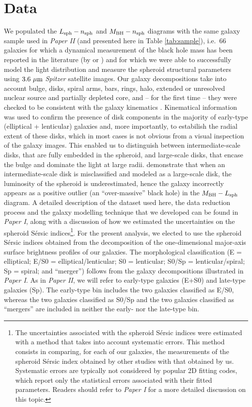 \documentclass[preprint2]{emulateapj}
\begin{document}
\section{Data}
We populated the $L_{\rm sph} - n_{\rm sph}$ and $M_{\rm BH} - n_{\rm sph}$ diagrams 
with the same galaxy sample used in \emph{Paper II} (and presented here in Table \ref{tab:sample}), 
i.e.~66 galaxies for which a dynamical measurement of the black hole mass has been reported in the literature 
(by \citealt{grahamscott2013} or \citealt{rusli2013}) 
and for which we were able to successfully model the light distribution and measure the spheroid structural parameters 
using $3.6\rm~\mu m$ \emph{Spitzer} satellite images. 
Our galaxy decompositions take into account bulge, disks, spiral arms, bars, rings, halo, 
extended or unresolved nuclear source and partially depleted core, 
and -- for the first time -- they were checked to be consistent with the galaxy kinematics 
\citep{atlas3dIII,scott2014,arnold2014}. 
Kinematical information was used to confirm the presence of disk components 
in the majority of early-type (elliptical + lenticular) galaxies and, more importantly,  
to estabilish the radial extent of these disks, 
which in most cases is not obvious from a visual inspection of the galaxy images. 
This enabled us to distinguish between intermediate-scale disks, 
that are fully embedded in the spheroid,  
and large-scale disks, that encase the bulge and dominate the light at large radii.  
\cite{ellicular} demonstrate that when an intermediate-scale disk is misclassified and modeled as a large-scale disk, 
the luminosity of the spheroid is underestimated, 
hence the galaxy incorrectly appears as a positive outlier (an ``over-massive'' black hole) in the $M_{\rm BH} - L_{\rm sph}$ diagram. 
A detailed description of the dataset used here, the data reduction process and the galaxy modelling technique that we developed 
can be found in \emph{Paper I}, 
along with a discussion of how we estimated the uncertainties on the spheroid S\'ersic indices\footnote{The uncertainties associated with 
the spheroid S\'ersic indices were estimated with a method that takes into account systematic errors. 
This method consists in comparing, for each of our galaxies, the measurements of the spheroid S\'ersic index obtained by other studies 
with that obtained by us. 
Systematic errors are typically not considered by popular 2D fitting codes, which report only the statistical errors 
associated with their fitted parameters. 
Readers should refer to \emph{Paper I} for a more detailed discussion on this topic. }. 
For the present analysis, we elected to use the spheroid S\'ersic indices obtained from the decomposition of the one-dimensional 
major-axis surface brightness profiles of our galaxies.  
The morphological classification (E = elliptical; E/S0 = elliptical/lenticular; S0 = lenticular; 
S0/Sp = lenticular/spiral; Sp = spiral; and ``merger'') follows from the galaxy decompositions illustrated in \emph{Paper I}. 
As in \emph{Paper II}, we will refer to early-type galaxies (E+S0) and late-type galaxies (Sp). 
The early-type bin includes the two galaxies classified as E/S0, 
whereas the two galaxies classified as S0/Sp and the two galaxies classified as ``mergers'' are included in neither the early- nor the late-type bin.
\end{document}
